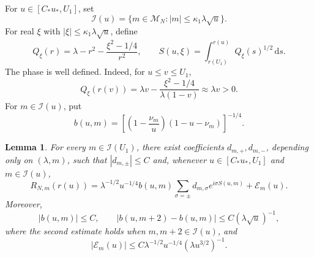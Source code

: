 \documentclass[11pt,a4paper]{amsart}
\newtheorem{lemma}[theorem]{Lemma}
\numberwithin{equation}{section}
\newcommand{\dd}{\,\mathrm d}
\begin{document}
For \(u\in[C_*u_*,U_1]\), set
\[
 \mathcal I(u)=\{m\in\mathcal M_N:|m|\le\kappa_1\lambda\sqrt u\}.
\]
For real \(\xi\) with \(|\xi|\le\kappa_1\lambda\sqrt u\), define
\[
 Q_\xi(r)=\lambda-r^2-\frac{\xi^2-1/4}{r^2},
 \qquad
 S(u,\xi)=\int_{r(U_1)}^{r(u)}Q_\xi(s)^{1/2}\dd s.
\]
The phase is well defined. Indeed, for \(u\le v\le U_1\),
\[
 Q_\xi(r(v))
 =\lambda v-\frac{\xi^2-1/4}{\lambda(1-v)}
 \approx\lambda v>0.
\]
For \(m\in\mathcal I(u)\), put
\[
 b(u,m)=\left[\left(1-\frac{\nu_m}{u}\right)
                (1-u-\nu_m)\right]^{-1/4}.
\]

\begin{lemma}\label{lem:lg-radial}
For every \(m\in\mathcal I(U_1)\), there exist coefficients
\(d_{m,+},d_{m,-}\), depending only on \((\lambda,m)\), such that
\(|d_{m,\pm}|\le C\) and, whenever
\(u\in[C_*u_*,U_1]\) and \(m\in\mathcal I(u)\),
\begin{equation}\label{eq:lg-expansion}
 R_{N,m}(r(u))
 =\lambda^{-1/2}u^{-1/4}b(u,m)
  \sum_{\sigma=\pm}d_{m,\sigma}e^{i\sigma S(u,m)}
  +\mathcal E_m(u).
\end{equation}
Moreover,
\begin{equation}\label{eq:lg-symbol}
 |b(u,m)|\le C,
 \qquad
 |b(u,m+2)-b(u,m)|\le C(\lambda\sqrt u)^{-1},
\end{equation}
where the second estimate holds when
\(m,m+2\in\mathcal I(u)\), and
\begin{equation}\label{eq:lg-error}
 |\mathcal E_m(u)|
 \le C\lambda^{-1/2}u^{-1/4}(\lambda u^{3/2})^{-1}.
\end{equation}
\end{lemma}
\end{document}

